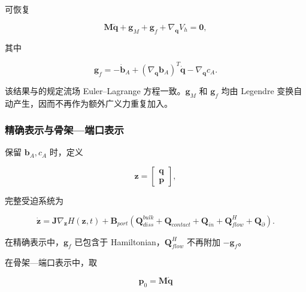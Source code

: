 可恢复

\begin{equation}
\label{eq:hamiltonian-3-51}
\boxed{\mathbf{M}\ddot{\mathbf{q}} + \mathbf{g}_{M} + \mathbf{g}_{f} + \nabla_{\mathbf{q}}V_{h} = \mathbf{0},}
\end{equation}

其中

\begin{equation}
\label{eq:hamiltonian-3-52}
\boxed{\mathbf{g}_{f} = - {\dot{\mathbf{b}}}_{A} + \left( \nabla_{\mathbf{q}}\mathbf{b}_{A} \right)^{T}\dot{\mathbf{q}} - \nabla_{\mathbf{q}}c_{A}.}
\end{equation}

该结果与的规定流场 Euler--Lagrange 方程一致。\(\mathbf{g}_{M}\) 和 \(\mathbf{g}_{f}\) 均由 Legendre 变换自动产生，因而不再作为额外广义力重复加入。

\subsubsection{精确表示与骨架---端口表示}\label{sec:hamiltonian-3-5-4}

保留 \(\mathbf{b}_{A},c_{A}\) 时，定义\cite{MarsdenRatiu1999MechanicsSymmetry,Arnold1989ClassicalMechanics}

\begin{equation}
\label{eq:hamiltonian-3-53}
\mathbf{z} = \begin{bmatrix}
\mathbf{q} \\
\mathbf{p}
\end{bmatrix},
\end{equation}

完整受迫系统为

\begin{equation}
\label{eq:hamiltonian-3-54}
\boxed{\dot{\mathbf{z}} = \mathbf{J}\nabla_{\mathbf{z}}H\left( \mathbf{z},t \right) + \mathbf{B}_{port}\left( \mathbf{Q}_{diss}^{bulk} + \mathbf{Q}_{contact} + \mathbf{Q}_{in} + \mathbf{Q}_{flow}^{H} + \mathbf{Q}_{\partial} \right).}
\end{equation}

在精确表示中，\(\mathbf{g}_{f}\) 已包含于 Hamiltonian，\(\mathbf{Q}_{flow}^{H}\) 不再附加 \(- \mathbf{g}_{f}\)。

在骨架---端口表示中，取

\begin{equation}
\label{eq:hamiltonian-3-55}
\mathbf{p}_{0} = \mathbf{M}\dot{\mathbf{q}}
\end{equation}

